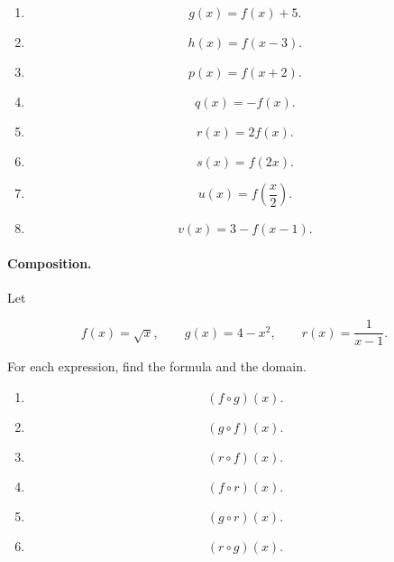 \begin{enumerate}
\item

\[
g(x)=f(x)+5.
\]

\item

\[
h(x)=f(x-3).
\]

\item

\[
p(x)=f(x+2).
\]

\item

\[
q(x)=-f(x).
\]

\item

\[
r(x)=2f(x).
\]

\item

\[
s(x)=f(2x).
\]

\item

\[
u(x)=f\left(\frac{x}{2}\right).
\]

\item

\[
v(x)=3-f(x-1).
\]
\end{enumerate}

\paragraph{Composition.}
Let

\[
f(x)=\sqrt{x},
\qquad
g(x)=4-x^2,
\qquad
r(x)=\frac{1}{x-1}.
\]

For each expression, find the formula and the domain.

\begin{enumerate}
\item

\[
(f\circ g)(x).
\]

\item

\[
(g\circ f)(x).
\]

\item

\[
(r\circ f)(x).
\]

\item

\[
(f\circ r)(x).
\]

\item

\[
(g\circ r)(x).
\]

\item

\[
(r\circ g)(x).
\]
\end{enumerate}

